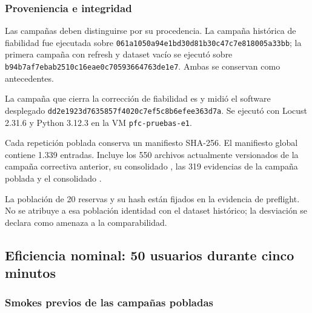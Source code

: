 \subsubsection{Proveniencia e integridad}

Las campañas deben distinguirse por su procedencia. La campaña histórica de
fiabilidad fue ejecutada sobre
\texttt{061a1050a94e1bd30d81b30c47c7e818005a33bb}; la primera campaña con
refresh y dataset vacío se ejecutó sobre
\texttt{b94b7af7ebab2510c16eae0c70593664763de1e7}. Ambas se conservan como
antecedentes.

La campaña que cierra la corrección de fiabilidad es
y midió el software desplegado
\texttt{dd2e1923d7635857f4020c7ef5c8b6efee363d7a}. Se ejecutó con Locust
2.31.6 y Python 3.12.3 en la VM \texttt{pfc-pruebas-e1}.

Cada repetición poblada conserva un manifiesto SHA-256. El manifiesto global
 contiene 1.339 entradas.
Incluye los 550 archivos actualmente versionados de la campaña correctiva
anterior, su consolidado
, las 319
evidencias de la campaña poblada y el consolidado
.

La población de 20 reservas y su hash están fijados en la evidencia de
preflight. No se atribuye a esa población identidad con el dataset histórico;
la desviación se declara como amenaza a la comparabilidad.

\subsection{Eficiencia nominal: 50 usuarios durante cinco minutos}
\label{subsec:eficiencia-nominal}

\subsubsection{Smokes previos de las campañas pobladas}

